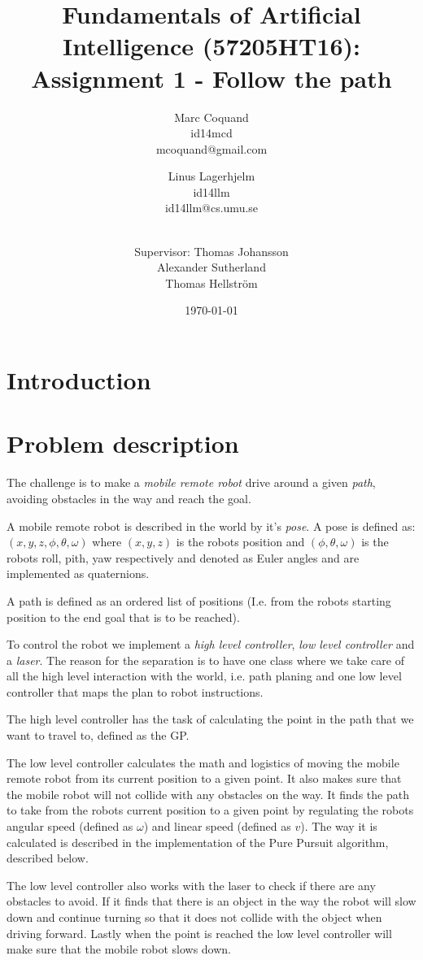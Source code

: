 \documentclass[12pt]{article}
\title{Fundamentals of Artificial Intelligence (57205HT16): Assignment 1 -
Follow the path}
\author{
    Marc Coquand \\ 
    id14mcd \\
    mcoquand@gmail.com \and
		Linus Lagerhjelm \\
		id14llm \\
		id14llm@cs.umu.se \and \\
		Supervisor: Thomas Johansson\\
		Alexander Sutherland \\
		Thomas Hellström
}
\date{\today}
\begin{document}
\maketitle

\newpage
\tableofcontents

\newpage
\section{Introduction}


\section{Problem description}

The challenge is to make a \textit{mobile remote robot} drive around a given
\textit{path}, avoiding obstacles in the way and reach the goal. 

A mobile remote robot is described in the world by it's \textit{pose}. A pose is
defined as: $(x, y, z, \phi, \theta, \omega)$ where $(x,y,z)$ is the robots
position and $(\phi, \theta, \omega)$ is the robots roll, pith, yaw respectively
and denoted as Euler angles and are implemented as quaternions.

A path is defined as an ordered list of positions (I.e. from the robots starting
position to the end goal that is to be reached).

To control the robot we implement a \textit{high level controller}, 
\textit{low level controller} and a \textit{laser}. The reason for the separation is to have one class
where we take care of all the high level interaction with the world, i.e. path planing and one low
level controller that maps the plan to robot instructions.

The high level controller has the task of calculating the point in the path that
we want to travel to, defined as the GP. 

The low level controller calculates the math and logistics of moving the mobile
remote robot from its current position to a given point. It also makes sure
that the mobile robot will not collide with any obstacles on the way. It finds the
path to take from the robots current position to a given point by regulating the
robots angular speed (defined as $\omega$) and linear speed (defined as $v$).
The way it is calculated is described in the implementation of the Pure
Pursuit algorithm, described below.

The low level controller also works with the laser to check if there are any
obstacles to avoid. If it finds that there is an object in the way the
robot will slow down and continue turning so that it does not collide with the
object when driving forward. Lastly when the point is reached the low level
controller will make sure that the mobile robot slows down.  
\end{document}
